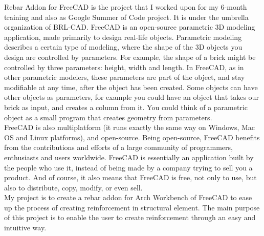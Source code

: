 \begin{Large}
\end{Large}

Rebar Addon for FreeCAD is the project that I worked upon for my 6-month training and also as Google Summer of Code project. It is under the umbrella organization of BRL-CAD. FreeCAD is an open-source parametric 3D modeling application, made primarily to design real-life objects. Parametric modeling describes a certain type of modeling, where the shape of the 3D objects you design are controlled by parameters. For example, the shape of a brick might be controlled by three parameters: height, width and length. In FreeCAD, as in other parametric modelers, these parameters are part of the object, and stay modifiable at any time, after the object has been created. Some objects can have other objects as parameters, for example you could have an object that takes our brick as input, and creates a column from it. You could think of a parametric object as a small program that creates geometry from parameters.\\

FreeCAD is also multiplatform (it runs exactly the same way on Windows, Mac OS and Linux platforms), and open-source. Being open-source, FreeCAD benefits from the contributions and efforts of a large community of programmers, enthusiasts and users worldwide. FreeCAD is essentially an application built by the people who use it, instead of being made by a company trying to sell you a product. And of course, it also means that FreeCAD is free, not only to use, but also to distribute, copy, modify, or even sell.\\

My project is to create a rebar addon for Arch Workbench of FreeCAD to ease up the process of creating reinforcement in structural element. The main purpose of this project is to enable the user to create reinforcement through an easy and intuitive way.\\

